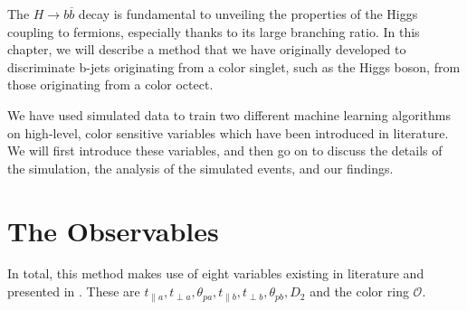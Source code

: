 \documentclass[10pt,a4paper]{book}
\begin{document}
The $H\rightarrow b\overline{b}$ decay is fundamental to unveiling the properties of the Higgs coupling to fermions, especially thanks to its large branching ratio. In this chapter, we will describe a method that we have originally developed to discriminate b-jets originating from a color singlet, such as the Higgs boson, from those originating from a color octect. 

We have used simulated data to train two different machine learning algorithms on high-level, color sensitive variables which have been introduced in literature. We will first introduce these variables, and then go on to discuss the details of the simulation, the analysis of the simulated events, and our findings.


\section{The Observables}
In total, this method makes use of eight variables existing in literature and presented in \cite{Larkoski:2019fsm, Larkoski:2014gra, Buckley:2020kdp}. These are $t_{\parallel a}, t_{\perp a}, \theta_{pa}, t_{\parallel b}, t_{\perp b}, \theta_{pb}, D_2$ and the color ring $\mathcal{O}$.
\end{document}
